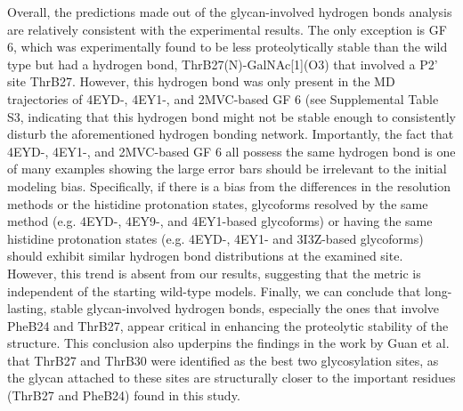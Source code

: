 \documentclass[9pt]{elife}
\begin{document}
Overall, the predictions made out of the glycan-involved hydrogen bonds analysis are relatively consistent with the experimental results. The only exception is GF 6, which was experimentally found to be less proteolytically stable than the wild type but had a hydrogen bond, ThrB27(N)-GalNAc[1](O3) that involved a P2' site ThrB27. However, this hydrogen bond was only present in the MD trajectories of 4EYD-, 4EY1-, and 2MVC-based GF 6 (see Supplemental Table S3, indicating that this hydrogen bond might not be stable enough to consistently disturb the aforementioned hydrogen bonding network. Importantly, the fact that 4EYD-, 4EY1-, and 2MVC-based GF 6 all possess the same hydrogen bond is one of many examples showing the large error bars should be irrelevant to the initial modeling bias. Specifically, if there is a bias from the differences in the resolution methods or the histidine protonation states, glycoforms resolved by the same method (e.g. 4EYD-, 4EY9-, and 4EY1-based glycoforms) or having the same histidine protonation states (e.g. 4EYD-, 4EY1- and 3I3Z-based glycoforms) should exhibit similar hydrogen bond distributions at the examined site. However, this trend is absent from our results, suggesting that the metric is independent of the starting wild-type models. Finally, we can conclude that long-lasting, stable glycan-involved hydrogen bonds, especially the ones that involve PheB24 and ThrB27, appear critical in enhancing the proteolytic stability of the structure. This conclusion also upderpins the findings in the work by Guan et al.~\cite{guan2018chemically} that ThrB27 and ThrB30 were identified as the best two glycosylation sites, as the glycan attached to these sites are structurally closer to the important residues (ThrB27 and PheB24) found in this study. 
\end{document}
